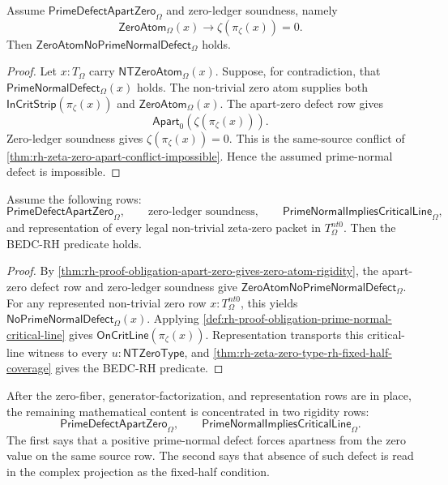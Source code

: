 \begin{theorem}
\label{thm:rh-proof-obligation-apart-zero-gives-zero-atom-rigidity}
Assume $\mathsf{PrimeDefectApartZero}_{\Omega}$ and zero-ledger soundness,
namely
$$
\mathsf{ZeroAtom}_{\Omega}(x)
\to
\zeta(\pi_{\zeta}(x))=0.
$$
Then $\mathsf{ZeroAtomNoPrimeNormalDefect}_{\Omega}$ holds.
\end{theorem}

\begin{proof}
Let $x:T_{\Omega}$ carry $\mathsf{NTZeroAtom}_{\Omega}(x)$. Suppose, for
contradiction, that $\mathsf{PrimeNormalDefect}_{\Omega}(x)$ holds. The
non-trivial zero atom supplies both $\mathsf{InCritStrip}(\pi_{\zeta}(x))$
and $\mathsf{ZeroAtom}_{\Omega}(x)$. The apart-zero defect row gives
$$
\mathsf{Apart}_{0}(\zeta(\pi_{\zeta}(x))).
$$
Zero-ledger soundness gives $\zeta(\pi_{\zeta}(x))=0$. This is the
same-source conflict of
\autoref{thm:rh-zeta-zero-apart-conflict-impossible}. Hence the assumed
prime-normal defect is impossible.
\end{proof}

\begin{theorem}
\label{thm:rh-proof-obligation-package-implies-rh}
Assume the following rows:
$$
\mathsf{PrimeDefectApartZero}_{\Omega},
\qquad
\text{zero-ledger soundness},
\qquad
\mathsf{PrimeNormalImpliesCriticalLine}_{\Omega},
$$
and representation of every legal non-trivial zeta-zero packet in
$T_{\Omega}^{nt0}$. Then the BEDC-RH predicate holds.
\end{theorem}

\begin{proof}
By \autoref{thm:rh-proof-obligation-apart-zero-gives-zero-atom-rigidity},
the apart-zero defect row and zero-ledger soundness give
$\mathsf{ZeroAtomNoPrimeNormalDefect}_{\Omega}$. For any represented
non-trivial zero row $x:T_{\Omega}^{nt0}$, this yields
$\mathsf{NoPrimeNormalDefect}_{\Omega}(x)$. Applying
\autoref{def:rh-proof-obligation-prime-normal-critical-line} gives
$\mathsf{OnCritLine}(\pi_{\zeta}(x))$. Representation transports this
critical-line witness to every $u:\mathsf{NTZeroType}$, and
\autoref{thm:rh-zeta-zero-type-rh-fixed-half-coverage} gives the BEDC-RH
predicate.
\end{proof}

\begin{principle}
\label{prin:rh-proof-obligation-remaining-content}
After the zero-fiber, generator-factorization, and representation rows are
in place, the remaining mathematical content is concentrated in two
rigidity rows:
$$
\mathsf{PrimeDefectApartZero}_{\Omega},
\qquad
\mathsf{PrimeNormalImpliesCriticalLine}_{\Omega}.
$$
The first says that a positive prime-normal defect forces apartness from
the zero value on the same source row. The second says that absence of such
defect is read in the complex projection as the fixed-half condition.
\end{principle}

